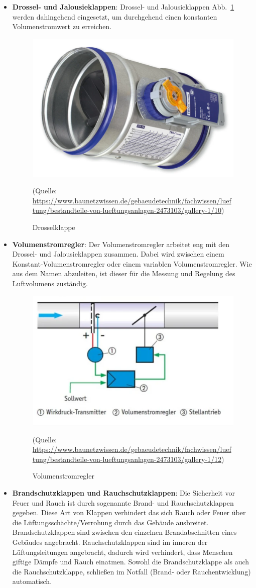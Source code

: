 \begin{itemize}
	\item \textbf{Drossel- und Jalousieklappen}: 
	Drossel- und Jalousieklappen Abb.~\ref{fig:drosselklappe} werden dahingehend eingesetzt, um durchgehend einen konstanten Volumenstromwert zu erreichen. 
	
	\begin{figure}[H]
		\centering
		\includegraphics[width=0.5\linewidth]{Bilder/drosselklappe}
		\caption{Drosselklappe} 
		(Quelle: \url{	https://www.baunetzwissen.de/gebaeudetechnik/fachwissen/lueftung/bestandteile-von-lueftungsanlagen-2473103/gallery-1/10})
		\label{fig:drosselklappe}
	\end{figure}
	
	\item \textbf{Volumenstromregler}: Der Volumenstromregler arbeitet eng mit den Drossel- und Jalousieklappen zusammen. Dabei wird zwischen einem Konstant-Volumenstromregler oder einem variablen Volumenstromregler. Wie aus dem Namen abzuleiten, ist dieser für die Messung und Regelung des Luftvolumens zuständig. 
	
	\begin{figure}[H]
		\centering
		\includegraphics[width=0.5\linewidth]{Bilder/volumenstromregler}
		\caption{Volumenstromregler} 
		(Quelle: \url{	https://www.baunetzwissen.de/gebaeudetechnik/fachwissen/lueftung/bestandteile-von-lueftungsanlagen-2473103/gallery-1/12})
		\label{fig:volumenstromregler}
	\end{figure}
	
	\item \textbf{Brandschutzklappen und Rauchschutzklappen}:
	Die Sicherheit vor Feuer und Rauch ist durch sogenannte Brand- und Rauchschutzklappen gegeben.
	Diese Art von Klappen verhindert das sich Rauch oder Feuer über die Lüftungsschächte/Verrohung durch das Gebäude ausbreitet. Brandschutzklappen sind zwischen den einzelnen Brandabschnitten eines Gebäudes angebracht. Rauchschutzklappen sind im inneren der Lüftungsleitungen angebracht, dadurch wird verhindert, dass Menschen giftige Dämpfe und Rauch einatmen. Sowohl die Brandschutzklappe als auch die Rauchschutzklappe, schließen im Notfall (Brand- oder Rauchentwicklung) automatisch.
\end{itemize}
\cite[vgl.][]{baunetz_bestandteile_nodate:o.J.}


